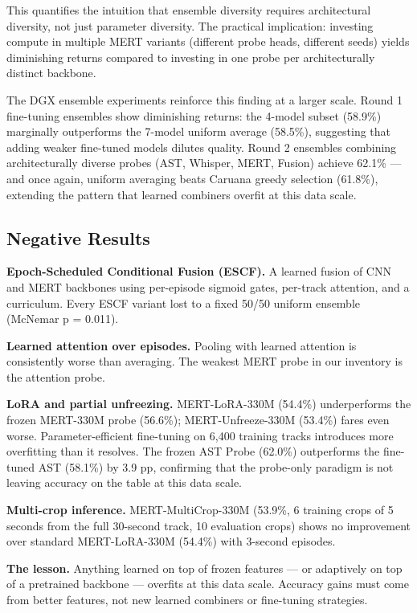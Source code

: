 \documentclass[conference]{IEEEtran}
\begin{document}
This quantifies the intuition that ensemble diversity requires
architectural diversity, not just parameter diversity. The practical
implication: investing compute in multiple MERT variants (different
probe heads, different seeds) yields diminishing returns compared to
investing in one probe per architecturally distinct backbone.

The DGX ensemble experiments reinforce this finding at a larger scale.
Round 1 fine-tuning ensembles show diminishing returns: the 4-model
subset (58.9\%) marginally outperforms the 7-model uniform average
(58.5\%), suggesting that adding weaker fine-tuned models dilutes
quality. Round 2 ensembles combining architecturally diverse probes
(AST, Whisper, MERT, Fusion) achieve 62.1\% --- and once again,
uniform averaging beats Caruana greedy selection (61.8\%), extending the
pattern that learned combiners overfit at this data scale.

\subsection{Negative Results}\label{f.-negative-results}

\textbf{Epoch-Scheduled Conditional Fusion (ESCF).} A learned fusion of
CNN and MERT backbones using per-episode sigmoid gates, per-track
attention, and a curriculum. Every ESCF variant lost to a fixed 50/50
uniform ensemble (McNemar p = 0.011).

\textbf{Learned attention over episodes.} Pooling with learned attention
is consistently worse than averaging. The weakest MERT probe in our
inventory is the attention probe.

\textbf{LoRA and partial unfreezing.} MERT-LoRA-330M (54.4\%)
underperforms the frozen MERT-330M probe (56.6\%); MERT-Unfreeze-330M
(53.4\%) fares even worse. Parameter-efficient fine-tuning on 6,400
training tracks introduces more overfitting than it resolves. The frozen
AST Probe (62.0\%) outperforms the fine-tuned AST (58.1\%) by 3.9 pp,
confirming that the probe-only paradigm is not leaving accuracy on the
table at this data scale.

\textbf{Multi-crop inference.} MERT-MultiCrop-330M (53.9\%, 6 training
crops of 5 seconds from the full 30-second track, 10 evaluation crops)
shows no improvement over standard MERT-LoRA-330M (54.4\%) with 3-second
episodes.

\textbf{The lesson.} Anything learned on top of frozen features ---
or adaptively on top of a pretrained backbone --- overfits at this
data scale. Accuracy gains must come from better features, not new
learned combiners or fine-tuning strategies.
\end{document}
